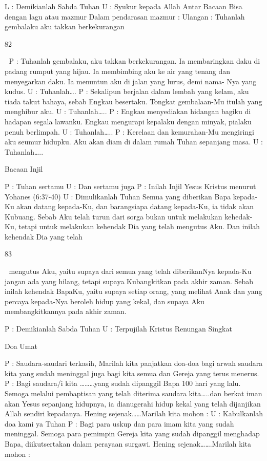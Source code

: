 \documentclass[10pt,a5paper,fancyhdr]{memoir}
\begin{document}
L : Demikianlah Sabda Tuhan 
U : Syukur kepada Allah 
Antar Bacaan 
Bisa dengan lagu atau mazmur 
Dalam pendarasan mazmur : 
Ulangan : Tuhanlah gembalaku aku takkan berkekurangan 

82 



P 
: Tuhanlah gembalaku, aku takkan berkekurangan. Ia 
membaringkan daku di padang rumput yang hijau. Ia 
membimbing aku ke air yang tenang dan menyegarkan 
daku. Ia menuntun aku di jalan yang lurus, demi nama-
Nya yang kudus. 
U : Tuhanlah…. 
P 
: Sekalipun berjalan dalam lembah yang kelam, aku tiada 
takut bahaya, sebab Engkau besertaku. Tongkat 
gembalaan-Mu itulah yang menghibur aku. 
U : Tuhanlah….. 
P 
: Engkau menyediakan hidangan bagiku di hadapan segala 
lawanku. Engkau mengurapi kepalaku dengan minyak, 
pialaku penuh berlimpah. 
U : Tuhanlah….. 
P : Kerelaan dan kemurahan-Mu mengiringi aku seumur 
hidupku. Aku akan diam di dalam rumah Tuhan 
sepanjang masa. 
U : Tuhanlah….. 

Bacaan Injil 

P : Tuhan sertamu 
U : Dan sertamu juga 
P : Inilah Injil Yesus Kristus menurut Yohanes (6:37-40) 
U : Dimulikanlah Tuhan 
Semua yang diberikan Bapa kepada-Ku akan datang 
kepada-Ku, dan barangsiapa datang kepada-Ku, ia tidak akan 
Kubuang. Sebab Aku telah turun dari sorga bukan untuk 
melakukan kehedak-Ku, tetapi untuk melakukan kehendak Dia 
yang telah mengutus Aku. Dan inilah kehendak Dia yang telah 

83 



mengutus Aku, yaitu supaya dari semua yang telah 
diberikanNya kepada-Ku jangan ada yang hilang, tetapi supaya 
Kubangkitkan pada akhir zaman. Sebab inilah kehendak 
BapaKu, yaitu supaya setiap orang, yang melihat Anak dan 
yang percaya kepada-Nya beroleh hidup yang kekal, dan 
supaya Aku membangkitkannya pada akhir zaman. 

P : Demikianlah Sabda Tuhan 
U : Terpujilah Kristus 
Renungan Singkat 

Doa Umat 

P 
: Saudara-saudari terkasih, 
Marilah kita panjatkan doa-doa bagi arwah saudara kita 
yang sudah meninggal juga bagi kita semua dan Gereja 
yang terus menerus. 
P 
: Bagi saudara/i kita ………yang sudah dipanggil Bapa 100 
hari yang lalu. Semoga melalui pembaptisan yang telah 
diterima saudara kita…..dan berkat iman akan Yesus 
sepanjang hidupnya, ia dianugerahi hidup kekal yang 
telah dijanjikan Allah sendiri kepadanya. 
Hening sejenak……Marilah kita mohon : 
U : Kabulkanlah doa kami ya Tuhan 
P 
: 
Bagi para uskup dan para imam kita yang sudah 
meninggal. 
Semoga para pemimpin Gereja kita yang sudah dipanggil 
menghadap Bapa, diikutsertakan dalam perayaan surgawi. 
Hening sejenak…….Marilah kita mohon : 
\end{document}
